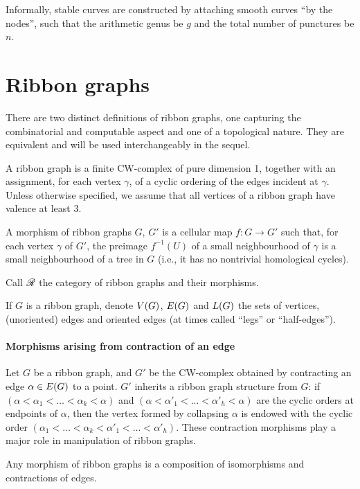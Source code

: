 Informally, stable curves are constructed by attaching smooth curves
``by the nodes'', such that the arithmetic genus be $g$ and the total
number of punctures be $n$.



\section{Ribbon graphs}
\label{sec:ribbon-graphs}

There are two distinct definitions of ribbon graphs, one capturing the
combinatorial and computable aspect and one of a topological nature.
They are equivalent and will be used interchangeably in the sequel.

\begin{definition}
  \label{dfn:ribbon-graphs}
  A ribbon graph is a finite CW-complex of pure dimension 1, together
  with an assignment, for each vertex $\gamma$, of a cyclic ordering of the
  edges incident at $\gamma$.  Unless otherwise specified, we assume that
  all vertices of a ribbon graph have valence at least 3.

  A morphism of ribbon graphs $G$, $G'$ is a cellular map $f:G\to G'$
  such that, for each vertex $\gamma$ of $G'$, the preimage $f^{-1}(U)$ of
  a small neighbourhood of $\gamma$ is a small neighbourhood of a tree in
  $G$ (i.e., it has no nontrivial homological cycles).
\end{definition}
Call $\mathscr{R}_{}$ the category of ribbon graphs and their morphisms.

If $G$ is a ribbon graph, denote $V(G)$, $E(G)$ and
$L(G)$ the sets of vertices, (unoriented) edges and oriented edges
(at times called ``legs'' or ``half-edges'').

\paragraph{Morphisms arising from contraction of an edge}
\label{sec:contractions}
Let $G$ be a ribbon graph, and $G'$ be the CW-complex obtained by
contracting an edge $\alpha \in E(G)$ to a point.  $G'$ inherits a
ribbon graph structure from $G$: if $(\alpha < \alpha_1 < \ldots < \alpha_k < \alpha)$ and $(\alpha
< \alpha'_1 < ... < \alpha'_h < \alpha)$ are the cyclic orders at endpoints of $\alpha$,
then the vertex formed by collapsing $\alpha$ is endowed with the cyclic
order $(\alpha_1 < \ldots < \alpha_k < \alpha'_1 < \ldots < \alpha'_h)$.  These contraction
morphisms play a major role in manipulation of ribbon graphs.
\begin{lemma}
  Any morphism of ribbon graphs is a composition of isomorphisms and
  contractions of edges. 
\end{lemma}


